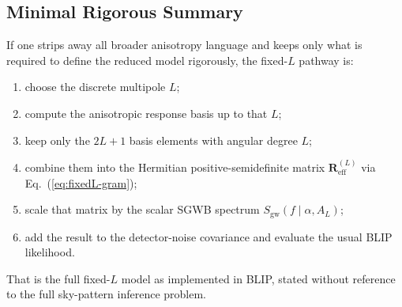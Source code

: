 \documentclass[11pt]{article}
\begin{document}
\subsection{Minimal Rigorous Summary}
If one strips away all broader anisotropy language and keeps only what is required to define the reduced model rigorously, the fixed-$L$ pathway is:
\begin{enumerate}
\item choose the discrete multipole \(L\);
\item compute the anisotropic response basis up to that \(L\);
\item keep only the \(2L+1\) basis elements with angular degree \(L\);
\item combine them into the Hermitian positive-semidefinite matrix \(\mathbf{R}^{(L)}_{\mathrm{eff}}\) via Eq.~(\ref{eq:fixedL-gram});
\item scale that matrix by the scalar SGWB spectrum \(S_{\mathrm{gw}}(f\mid \alpha,A_L)\);
\item add the result to the detector-noise covariance and evaluate the usual BLIP likelihood.
\end{enumerate}
That is the full fixed-$L$ model as implemented in BLIP, stated without reference to the full sky-pattern inference problem.
\end{document}
